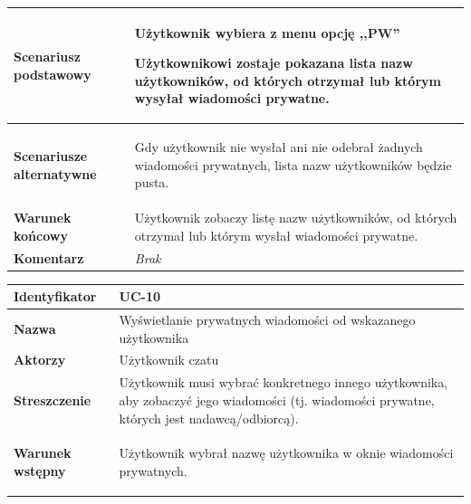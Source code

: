 {\begin{tabular}{ | l | l | }
	\hline
		\textbf{Scenariusz podstawowy} & \parbox[t]{11cm}{
			\begin{enumreq}
				\item Użytkownik wybiera z menu opcję ,,PW''
				\item Użytkownikowi zostaje pokazana lista nazw użytkowników,	od których
				otrzymał lub którym wysyłał wiadomości prywatne.
			\end{enumreq}
		}
		\\

	\hline
		\textbf{Scenariusze alternatywne} & \parbox[t]
		{11cm}{
			\begin{enumreq}
				\item Gdy użytkownik nie wysłał ani nie odebrał żadnych wiadomości
				prywatnych, lista nazw użytkowników będzie pusta.
			\end{enumreq}
		}
		\\

	\hline
		\textbf{Warunek końcowy} & \parbox[t]{11cm}{
			Użytkownik zobaczy listę nazw użytkowników, od których otrzymał lub którym
			wysłał wiadomości prywatne.
		}
		\\

	\hline
		\textbf{Komentarz} & \parbox[t]{11cm}{
			\textit{Brak}
		}
		\\

	\hline
\end{tabular}

\vspace{2em}

\begin{tabular}{ | l | l | }
	\hline
		\textbf{Identyfikator} &
		UC-10
		\\

	\hline
		\textbf{Nazwa} &
		Wyświetlanie prywatnych wiadomości od wskazanego użytkownika
		\\

	\hline
		\textbf{Aktorzy} & \parbox[t]{11cm}{
			Użytkownik czatu
		}\\

	\hline
		\textbf{Streszczenie} & \parbox[t]{11cm}{
			Użytkownik musi wybrać konkretnego innego użytkownika, aby zobaczyć jego
			wiadomości (tj. wiadomości prywatne, których jest nadawcą/odbiorcą).

		}\\

	\hline
		\textbf{Warunek wstępny} & \parbox[t]{11cm}{
			\begin{enumreq}
				\item Użytkownik wybrał nazwę użytkownika w oknie wiadomości prywatnych.
			\end{enumreq}

}
\end{tabular}}
